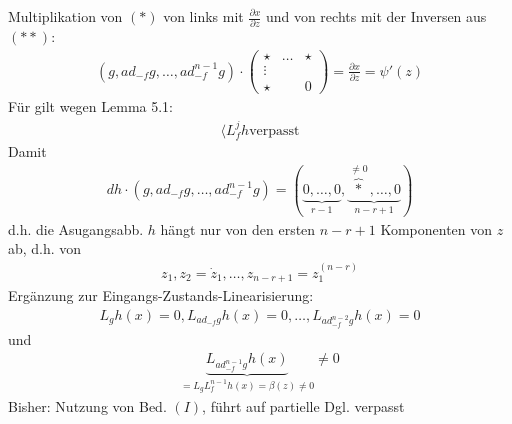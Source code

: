 \documentclass[ngerman]{tudscrreprt}
\begin{document}
Multiplikation von $(*)$ von links mit $\frac{\partial x}{\partial z}$ und von rechts mit der Inversen aus $(**)$: \begin{align*}
(g, ad_{-f}g, \dots, ad_{-f}^{n-1} g)\cdot \begin{pmatrix} \star & \dots & \star\\ \vdots & & \\ \star & &0\end{pmatrix} = \frac{\partial x}{\partial z} = \psi'(z) 
\end{align*}Für gilt wegen Lemma 5.1: \begin{align*}
\langle L_f^j h \text{verpasst}
\end{align*}
Damit \begin{align*}
dh\cdot (g, ad_{-f}g, \dots, ad_{-f}^{n-1} g) = (\underbrace{0,\dots, 0}_{r-1} ,\underbrace{\overbrace{*}^{\ne 0},\dots, 0}_{n-r+1})
\end{align*}
d.h. die Asugangsabb. $h$ hängt nur von den ersten $n-r+1$ Komponenten
von $z$ ab, d.h. von \begin{align*}
z_1, z_2 = \dot z_1, \dots, z_{n-r+1} = z_1^{(n-r)}
\end{align*}
Ergänzung zur Eingangs-Zustands-Linearisierung: \begin{align*}
L_g h(x) = 0, L_{ad_{-f}g} h(x) = 0,\dots, L_{ad_{-f}^{n-2} g}h(x)= 0 \tag{I}
\end{align*}
und \begin{align*}
\underbrace{L_{ad_{-f}^{n-1}g}h(x)}_{= L_g L_f^{n-1} h(x) = \beta(z)\ne 0}\ne 0 \tag{II}
\end{align*}
Bisher: Nutzung von Bed. $(I)$, führt auf partielle Dgl. 
verpasst
\end{document}
